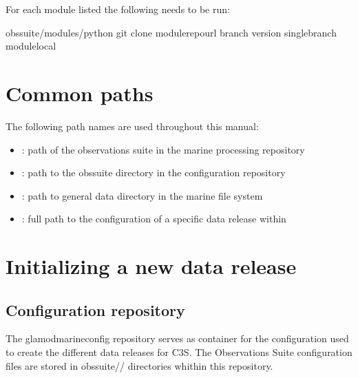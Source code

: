 \documentclass[letterpaper,10pt,english]{sphinxmanual}
\begin{document}
For each module listed the following needs to be run:

\begin{sphinxVerbatim}[commandchars=\\\{\}]
 obs\PYGZhy{}suite/modules/python
git clone module\PYGZus{}repo\PYGZus{}url \PYGZhy{}\PYGZhy{}branch version \PYGZhy{}\PYGZhy{}single\PYGZhy{}branch module\PYGZus{}local
\end{sphinxVerbatim}


\chapter{Common paths}
\label{\detokenize{index:common-paths}}
The following path names are used throughout this manual:
\begin{itemize}
\item {} 
: path of the observations suite in the marine processing repository

\item {} 
: path to the obs\sphinxhyphen{}suite directory in the configuration repository

\item {} 
: path to general data directory in the marine file system

\item {} 
: full path to the configuration of a specific data release
within 

\end{itemize}


\chapter{Initializing a new data release}
\label{\detokenize{index:initializing-a-new-data-release}}

\section{Configuration repository}
\label{\detokenize{index:configuration-repository}}
The glamod\sphinxhyphen{}marine\sphinxhyphen{}config repository serves as container for the configuration
used to create the different data releases for C3S. The Observations Suite
configuration files are stored in obs\sphinxhyphen{}suite/\sphinxhyphen{}/
directories whithin this repository.
\end{document}
